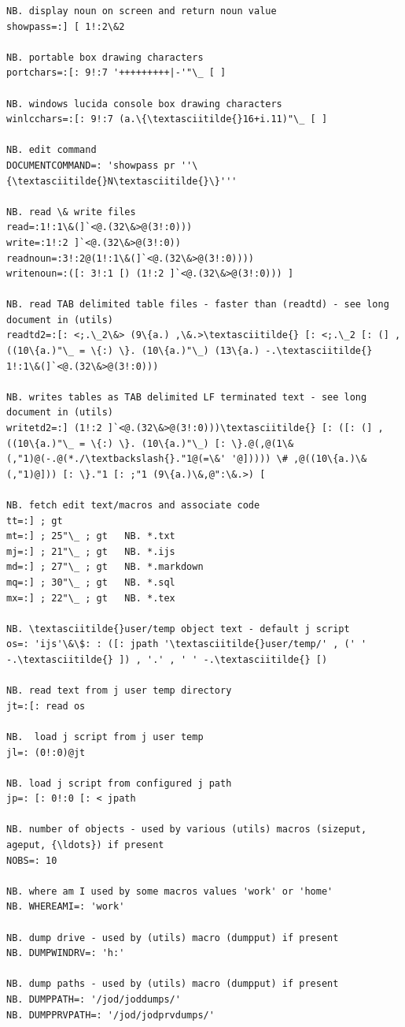 \documentclass[11pt,letter,landscape]{article}
\begin{document}
\begin{Verbatim}[commandchars=\\\{\}]
NB. display noun on screen and return noun value
showpass=:] [ 1!:2\&2

NB. portable box drawing characters
portchars=:[: 9!:7 '+++++++++|-'"\_ [ ]

NB. windows lucida console box drawing characters
winlcchars=:[: 9!:7 (a.\{\textasciitilde{}16+i.11)"\_ [ ]

NB. edit command 
DOCUMENTCOMMAND=: 'showpass pr ''\{\textasciitilde{}N\textasciitilde{}\}'''

NB. read \& write files
read=:1!:1\&(]`<@.(32\&>@(3!:0)))
write=:1!:2 ]`<@.(32\&>@(3!:0))
readnoun=:3!:2@(1!:1\&(]`<@.(32\&>@(3!:0))))
writenoun=:([: 3!:1 [) (1!:2 ]`<@.(32\&>@(3!:0))) ]

NB. read TAB delimited table files - faster than (readtd) - see long document in (utils)
readtd2=:[: <;.\_2\&> (9\{a.) ,\&.>\textasciitilde{} [: <;.\_2 [: (] , ((10\{a.)"\_ = \{:) \}. (10\{a.)"\_) (13\{a.) -.\textasciitilde{} 1!:1\&(]`<@.(32\&>@(3!:0)))

NB. writes tables as TAB delimited LF terminated text - see long document in (utils)
writetd2=:] (1!:2 ]`<@.(32\&>@(3!:0)))\textasciitilde{} [: ([: (] , ((10\{a.)"\_ = \{:) \}. (10\{a.)"\_) [: \}.@(,@(1\&(,"1)@(-.@(*./\textbackslash{}."1@(=\&' '@])))) \# ,@((10\{a.)\&(,"1)@])) [: \}."1 [: ;"1 (9\{a.)\&,@":\&.>) [

NB. fetch edit text/macros and associate code
tt=:] ; gt
mt=:] ; 25"\_ ; gt   NB. *.txt
mj=:] ; 21"\_ ; gt   NB. *.ijs
md=:] ; 27"\_ ; gt   NB. *.markdown
mq=:] ; 30"\_ ; gt   NB. *.sql
mx=:] ; 22"\_ ; gt   NB. *.tex

NB. \textasciitilde{}user/temp object text - default j script
os=: 'ijs'\&\$: : ([: jpath '\textasciitilde{}user/temp/' , (' ' -.\textasciitilde{} ]) , '.' , ' ' -.\textasciitilde{} [)
 
NB. read text from j user temp directory
jt=:[: read os
 
NB.  load j script from j user temp
jl=: (0!:0)@jt

NB. load j script from configured j path
jp=: [: 0!:0 [: < jpath

NB. number of objects - used by various (utils) macros (sizeput, ageput, {\ldots}) if present
NOBS=: 10

NB. where am I used by some macros values 'work' or 'home'
NB. WHEREAMI=: 'work'

NB. dump drive - used by (utils) macro (dumpput) if present
NB. DUMPWINDRV=: 'h:'

NB. dump paths - used by (utils) macro (dumpput) if present
NB. DUMPPATH=: '/jod/joddumps/'
NB. DUMPPRVPATH=: '/jod/jodprvdumps/'


\end{Verbatim}
\end{document}
